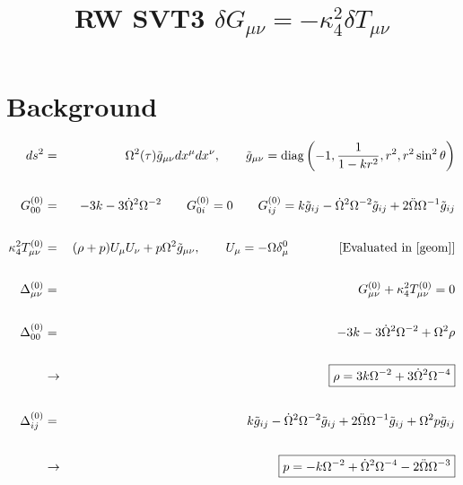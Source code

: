 \documentclass[10pt,letterpaper]{article}
\title{RW SVT3 $\delta G_{\mu\nu}=-\kappa^2_4\delta T_{\mu\nu}$}
\date{}
\numberwithin{equation}{section}
\begin{document}
 
\maketitle
\noindent 
\section{Background}
\begin{eqnarray}
ds^2 &=& \Omega^2(\tau)\tilde g_{\mu\nu} dx^\mu dx^\nu,\qquad 
\tilde g_{\mu\nu} = \text{diag}\left(-1,\frac{1}{1-kr^2},r^2,r^2\sin^2\theta\right)
\label{geom}
\\ \nonumber\\
G^{(0)}_{00}&=& -3k - 3 \dot\Omega^2\Omega^{-2}
\qquad
G^{(0)}_{0i} =0
\qquad
G^{(0)}_{ij} = k\tilde g_{ij} - \dot\Omega^2\Omega^{-2}\tilde g_{ij} + 2\ddot\Omega \Omega^{-1} \tilde g_{ij}
\\ \nonumber\\
\kappa^2_4 T_{\mu\nu}^{(0)} &=& (\rho+p)U_\mu U_\nu + p \Omega^2 \tilde g_{\mu\nu},\qquad U_\mu = - \Omega \delta^0_\mu  \qquad\qquad  \text{[Evaluated in \eqref{geom}]}
\\ \nonumber\\
\Delta^{(0)}_{\mu\nu} &=& G_{\mu\nu}^{(0)}+\kappa^2_4 T_{\mu\nu}^{(0)} =0
\\ \nonumber\\
\Delta^{(0)}_{00} &=& -3k - 3 \dot\Omega^2\Omega^{-2} + \Omega^2 \rho
\\ \nonumber\\
&\to&\boxed{\rho = 3k\Omega^{-2}+3\dot\Omega^2 \Omega^{-4}}
\label{rho}
\\ \nonumber\\
\Delta^{(0)}_{ij} &=& k\tilde g_{ij} - \dot\Omega^2\Omega^{-2}\tilde g_{ij} + 2\ddot\Omega \Omega^{-1} \tilde g_{ij} + \Omega^2 p
\tilde g_{ij}
\\ \nonumber\\
&\to& \boxed{p = -k\Omega^{-2} + \dot\Omega^2\Omega^{-4} -2\ddot\Omega \Omega^{-3}}
\label{p}
\end{eqnarray}
%
%
%
\end{document}
